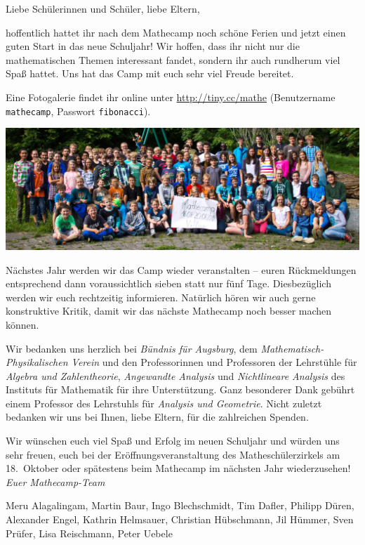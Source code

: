 \documentclass[12pt]{zettel}
\begin{document}
\renewcommand{\betreff}{Mathecamp -- schön war's!}

\makeletterhead{}
\vspace{-2em}

Liebe Schülerinnen und Schüler, liebe Eltern,

hoffentlich hattet ihr nach dem Mathecamp noch schöne Ferien und jetzt einen
guten Start in das neue Schuljahr! Wir hoffen, dass ihr nicht nur die
mathematischen Themen interessant fandet, sondern ihr auch rundherum viel
Spaß hattet. Uns hat das Camp mit euch sehr viel Freude bereitet.

Eine Fotogalerie findet ihr online unter \url{http://tiny.cc/mathe}
(Benutzername \texttt{mathecamp}, Passwort \texttt{fibonacci}).

\begin{center}
  \includegraphics[scale=1.2]{gruppenfoto-ausschnitt}
\end{center}

Nächstes Jahr werden wir das Camp wieder veranstalten -- euren Rückmeldungen
entsprechend dann voraussichtlich sieben statt nur fünf Tage. Diesbezüglich
werden wir euch rechtzeitig informieren. Natürlich hören wir auch gerne
konstruktive Kritik, damit wir das nächste Mathecamp noch besser
machen können.

Wir bedanken uns herzlich bei \emph{Bündnis für Augsburg}, dem
\emph{Mathematisch-Physikalischen Verein} und den Professorinnen und
Professoren der Lehrstühle für \emph{Algebra und Zahlentheorie},
\emph{Angewandte Analysis} und \emph{Nichtlineare Analysis} des Instituts für
Mathematik für ihre Unterstützung.
Ganz besonderer Dank gebührt einem Professor des
Lehrstuhls für \emph{Analysis und Geometrie}.
Nicht zuletzt bedanken wir uns bei Ihnen, liebe Eltern, für die zahlreichen
Spenden.

Wir wünschen euch viel Spaß und Erfolg im neuen Schuljahr und würden uns
sehr freuen, euch bei der Eröffnungsveranstaltung des Matheschülerzirkels am
18.~Oktober oder spätestens beim Mathecamp im nächsten Jahr wiederzusehen!
\emph{Euer Mathecamp-Team}

{\small Meru Alagalingam, Martin Baur, Ingo Blechschmidt, Tim Dafler, Philipp Düren,
Alexander Engel, Kathrin Helmsauer,
Christian Hübschmann, Jil Hümmer, Sven Prüfer,
Lisa Reischmann, Peter Uebele}
\end{document}
